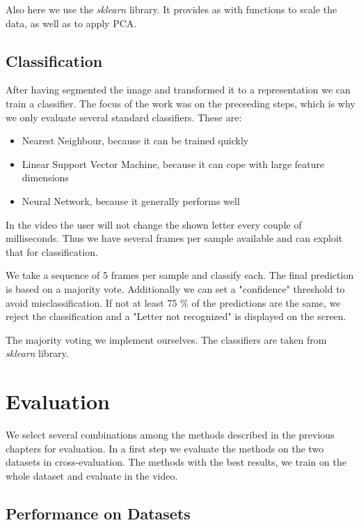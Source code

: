 \documentclass[letterpaper, 10 pt, conference]{ieeeconf}  %
\begin{document}
Also here we use the \textit{sklearn} library. It provides as with functions to scale the data, as well as to apply PCA.

\subsection{Classification}

After having segmented the image and transformed it to a representation we can train a classifier. The focus of the work was on the preceeding steps, which is why we only evaluate several standard classifiers. These are:

\begin{itemize}
	\item Nearest Neighbour, because it can be trained quickly 
	\item Linear Support Vector Machine, because it can cope with large feature dimensions
	\item Neural Network, because it generally performs well
\end{itemize}

In the video the user will not change the shown letter every couple of milliseconds. Thus we have several frames per sample available and can exploit that for classification. 

We take a sequence of 5 frames per sample and classify each. The final prediction is based on a majority vote. Additionally we can set a "confidence" threshold to avoid misclassification. If not at least 75 \% of the predictions are the same, we reject the classification and a "Letter not recognized" is displayed on the screen.

The majority voting we implement ourselves. The classifiers are taken from \textit{sklearn} library.

\section{Evaluation}
\label{sec:eval}
We select several combinations among the methods described in the previous chapters for evaluation. In a first step we evaluate the methods on the two datasets in cross-evaluation. The methods with the best results, we train on the whole dataset and evaluate in the video.

\subsection{Performance on Datasets}
\end{document}
